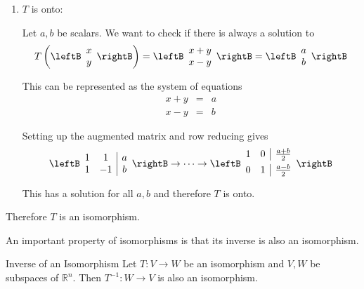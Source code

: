 \begin{solution}
\begin{enumerate}
\item $T$ is onto:

Let $a,b$ be scalars. We want to check if there is always a solution to 
\[
T  \left( \leftB \begin{array}{c}
x \\
y
\end{array} \rightB \right) = \leftB \begin{array}{c}
x + y\\
x - y 
\end{array} \rightB = \leftB \begin{array}{c}
a \\
b
\end{array} \rightB
\]

This can be represented as the system of equations 
\begin{eqnarray*}
x + y &=& a\\
x - y &=& b
\end{eqnarray*}

Setting up the augmented matrix and row reducing gives
\[
\leftB \begin{array}{cc|c}
1 & 1 & a \\
1 & -1 & b
\end{array} \rightB \rightarrow \cdots \rightarrow
\leftB \begin{array}{cc|c}
1 & 0 & \vspace{0.05in}\frac{a+b}{2} \\
0 & 1 & \vspace{0.05in}\frac{a-b}{2}
\end{array} \rightB
\]
This has a solution for all $a,b$ and therefore $T$ is onto. 
\end{enumerate}

Therefore $T$ is an isomorphism.
\end{solution}

An important property of isomorphisms is that its inverse is also an isomorphism. 

\begin{proposition}{Inverse of an Isomorphism}\label{prop:inverseisomorphism}
Let $T:V\rightarrow W$ be an isomorphism and $V,W$ be subspaces of $\mathbb{R}^n$. Then $T^{-1}:W\rightarrow V$ is
also an isomorphism.
\end{proposition}

